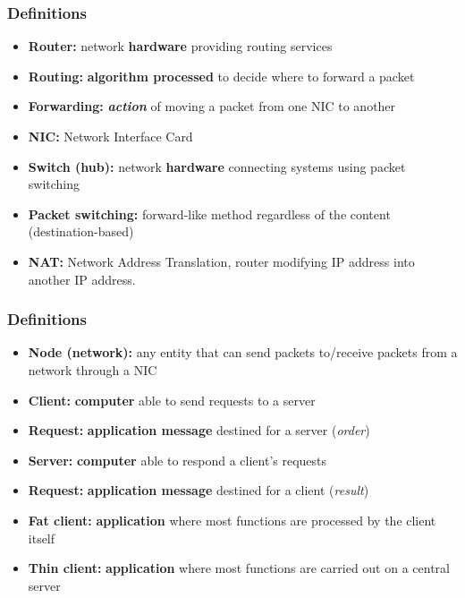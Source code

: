   \begin{frame}
    \frametitle{Definitions}
      \begin{itemize}
        \item \textbf{Router:} network \textbf{hardware} providing routing services\pause
        \item \textbf{Routing:} \textbf{algorithm processed} to decide where to forward a packet\pause
        \item \textbf{Forwarding:} \textbf{\emph{action}} of moving a packet from one NIC to another\pause
        \item \textbf{NIC:} Network Interface Card
        \item \textbf{Switch (hub):} network \textbf{hardware} connecting systems using packet switching\pause
        \item \textbf{Packet switching:} forward-like method regardless of the content (destination-based)\pause
        \item \textbf{NAT:} Network Address Translation, router modifying IP address into another IP address.
      \end{itemize}
  \end{frame}
  \begin{frame}
    \frametitle{Definitions}
      \begin{itemize}
        \item \textbf{Node (network):} any entity that can send packets to/receive packets from a network through a NIC\pause
        \item \textbf{Client:} \textbf{computer} able to send requests to a server\pause
        \item \textbf{Request:} \textbf{application message} destined for a server (\emph{order})\pause
        \item \textbf{Server:} \textbf{computer} able to respond a client's requests\pause
        \item \textbf{Request:} \textbf{application message} destined for a client (\emph{result})\pause
        \item \textbf{Fat client:} \textbf{application} where most functions are processed by the client itself\pause
        \item \textbf{Thin client:} \textbf{application} where most functions are carried out on a central server
      \end{itemize}
  \end{frame}


